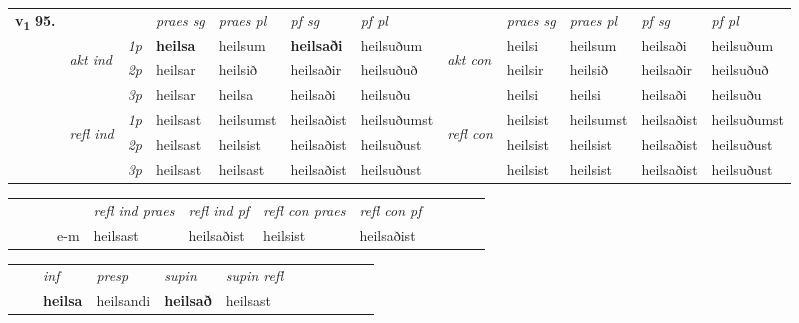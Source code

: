 \begin{tabular}{llllllllllll} \toprule
\multirow{4}{*}{{{\textbf{v{\textsubscript{1}}} \Large{\textbf{95.}}}}}  & &   &  \textit{praes sg}  & \textit{praes pl}  &\textit{ pf sg} & \textit{pf pl} &  &  \textit{praes sg}  & \textit{praes pl}  & \textit{pf sg} & \textit{pf pl } \\*
	\cmidrule{4-7} \cmidrule{9-12}
 & \multirow{3}{*}{\begin{turn}{90}\textit{akt ind}\end{turn}} & {\textit{1p}} & \textbf{heilsa} & heilsum    & \textbf{heilsaði} & heilsuðum & \multirow{3}{*}{\begin{turn}{90}\textit{akt con}\end{turn}} &heilsi & heilsum & heilsaði & heilsuðum\\*
& &  {\textit{2p}} &  heilsar  & heilsið   & heilsaðir & heilsuðuð & & heilsir & heilsið & heilsaðir & heilsuðuð \\*
& &  {\textit{3p}} & heilsar & heilsa   & heilsaði & heilsuðu & & heilsi & heilsi& heilsaði & heilsuðu  \\*
\cmidrule{4-7} \cmidrule{9-12}
 &\multirow{3}{*}{\begin{turn}{90}\textit{refl ind}\end{turn}} & {\textit{1p}} & heilsast & heilsumst    & heilsaðist & heilsuðumst & \multirow{3}{*}{\begin{turn}{90}\textit{refl con}\end{turn}}  &heilsist & heilsumst & heilsaðist & heilsuðumst\\*
 &&  {\textit{2p}} &  heilsast  & heilsist   & heilsaðist & heilsuðust & &heilsist & heilsist & heilsaðist & heilsuðust \\*
& &  {\textit{3p}} & heilsast & heilsast   & heilsaðist & heilsuðust & & heilsist & heilsist& heilsaðist & heilsuðust  \\*
\cmidrule{4-7} \cmidrule{9-12}
\end{tabular}


\begin{tabular}{llllllllllll}
 & &  & &  \textit{refl ind praes} & \textit{refl ind pf} & \textit{refl con praes} & \textit{refl con pf} \\*
&  & & e-m & heilsast & heilsaðist & heilsist & heilsaðist \\*
\cmidrule{5-9}
\end{tabular}


\begin{tabular}{llllllllllll}
 & & \textit{inf}     & \textit{presp} & \textit{supin} & \textit{supin refl}      \\*
  & & \textbf{heilsa}      & heilsandi &  \textbf{heilsað} & heilsast  \\*
\cmidrule{1-12}
\end{tabular}






